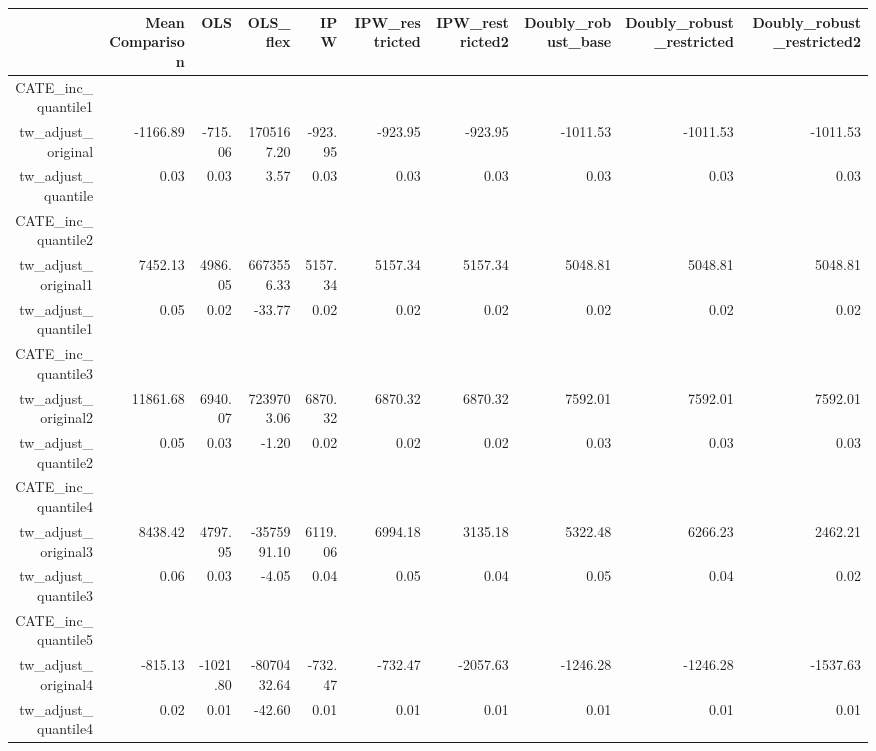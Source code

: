 \begin{table}[ht]
\centering
\begin{tabular}{rrrrrrrrrr}
  \hline
 & Mean Comparison & OLS & OLS\_flex & IPW & IPW\_restricted & IPW\_restricted2 & Doubly\_robust\_base & Doubly\_robust\_restricted & Doubly\_robust\_restricted2 \\ 
  \hline
CATE\_inc\_quantile1 &  &  &  &  &  &  &  &  &  \\ 
  tw\_adjust\_original & -1166.89 & -715.06 & 1705167.20 & -923.95 & -923.95 & -923.95 & -1011.53 & -1011.53 & -1011.53 \\ 
  tw\_adjust\_quantile & 0.03 & 0.03 & 3.57 & 0.03 & 0.03 & 0.03 & 0.03 & 0.03 & 0.03 \\ 
  CATE\_inc\_quantile2 &  &  &  &  &  &  &  &  &  \\ 
  tw\_adjust\_original1 & 7452.13 & 4986.05 & 6673556.33 & 5157.34 & 5157.34 & 5157.34 & 5048.81 & 5048.81 & 5048.81 \\ 
  tw\_adjust\_quantile1 & 0.05 & 0.02 & -33.77 & 0.02 & 0.02 & 0.02 & 0.02 & 0.02 & 0.02 \\ 
  CATE\_inc\_quantile3 &  &  &  &  &  &  &  &  &  \\ 
  tw\_adjust\_original2 & 11861.68 & 6940.07 & 7239703.06 & 6870.32 & 6870.32 & 6870.32 & 7592.01 & 7592.01 & 7592.01 \\ 
  tw\_adjust\_quantile2 & 0.05 & 0.03 & -1.20 & 0.02 & 0.02 & 0.02 & 0.03 & 0.03 & 0.03 \\ 
  CATE\_inc\_quantile4 &  &  &  &  &  &  &  &  &  \\ 
  tw\_adjust\_original3 & 8438.42 & 4797.95 & -3575991.10 & 6119.06 & 6994.18 & 3135.18 & 5322.48 & 6266.23 & 2462.21 \\ 
  tw\_adjust\_quantile3 & 0.06 & 0.03 & -4.05 & 0.04 & 0.05 & 0.04 & 0.05 & 0.04 & 0.02 \\ 
  CATE\_inc\_quantile5 &  &  &  &  &  &  &  &  &  \\ 
  tw\_adjust\_original4 & -815.13 & -1021.80 & -8070432.64 & -732.47 & -732.47 & -2057.63 & -1246.28 & -1246.28 & -1537.63 \\ 
  tw\_adjust\_quantile4 & 0.02 & 0.01 & -42.60 & 0.01 & 0.01 & 0.01 & 0.01 & 0.01 & 0.01 \\ 
   \hline
\end{tabular}
\end{table}
